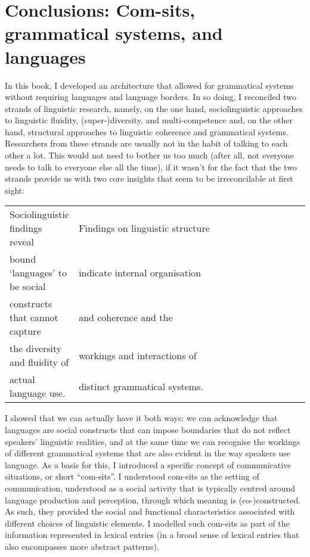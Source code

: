 \chapter{Conclusions: Com-sits, grammatical systems, and languages}\label{chap:6}
\hypertarget{Toc125444667}{}
In this book, I developed an architecture that allowed for grammatical systems without requiring languages and language borders. In so doing, I reconciled two strands of linguistic research, namely, on the one hand, sociolinguistic approaches to linguistic fluidity, (super\nobreakdash-)diversity, and multi-competence and, on the other hand, structural approaches to linguistic coherence and grammatical systems. Researchers from these strands are usually not in the habit of talking to each other a lot. This would not need to bother us too much (after all, not everyone needs to talk to everyone else all the time), if it wasn’t for the fact that the two strands provide us with two core insights that seem to be irreconcilable at first sight:\medskip

\vspace{.3cm}

\begin{tabular}{l p{1\linewidth}}
Sociolinguistic findings reveal  & Findings on linguistic structure\\
bound ‘languages’ to be social  & indicate internal organisation\\
constructs that cannot capture & and coherence and the\\
the diversity and fluidity of & workings and interactions of\\
actual language use. & distinct grammatical systems.\\
\end{tabular}

\vspace{.4cm}


I showed that we can actually have it both ways: we can acknowledge that languages are social constructs that can impose boundaries that do not reflect speakers’ linguistic realities, and at the same time we can recognise the workings of different grammatical systems that are also evident in the way speakers use language. As a basis for this, I introduced a specific concept of communicative situations, or short “com-sits”. I understood com-sits as the setting of communication, understood as a social activity that is typically centred around language production and perception, through which meaning is (co\nobreakdash-)constructed. As such, they provided the social and functional characteristics associated with different choices of linguistic elements. I modelled such com-sits as part of the information represented in lexical entries (in a broad sense of lexical entries that also encompasses more abstract patterns).

